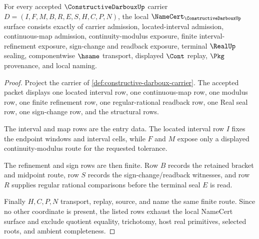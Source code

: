 \begin{theorem}
\label{thm:constructive-darboux-obligation-basis}
For every accepted $\ConstructiveDarbouxUp$ carrier $D=(I,F,M,B,R,E,S,H,C,P,N)$, the local $\NameCert_{\ConstructiveDarbouxUp}$ surface consists exactly of carrier admission, located-interval admission, continuous-map admission, continuity-modulus exposure, finite interval-refinement exposure, sign-change and readback exposure, terminal $\RealUp$ sealing, componentwise $\hsame$ transport, displayed $\Cont$ replay, $\Pkg$ provenance, and local naming.
\end{theorem}
\begin{proof}
Project the carrier of \autoref{def:constructive-darboux-carrier}. The accepted packet displays one located interval row, one continuous-map row, one modulus row, one finite refinement row, one regular-rational readback row, one Real seal row, one sign-change row, and the structural rows.

The interval and map rows are the entry data. The located interval row $I$ fixes the endpoint windows and interval cells, while $F$ and $M$ expose only a displayed continuity-modulus route for the requested tolerance.

The refinement and sign rows are then finite. Row $B$ records the retained bracket and midpoint route, row $S$ records the sign-change/readback witnesses, and row $R$ supplies regular rational comparisons before the terminal seal $E$ is read.

Finally $H,C,P,N$ transport, replay, source, and name the same finite route. Since no other coordinate is present, the listed rows exhaust the local NameCert surface and exclude quotient equality, trichotomy, host real primitives, selected roots, and ambient completeness.
\end{proof}

